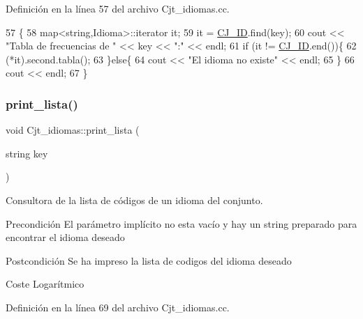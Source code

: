 Definición en la línea 57 del archivo Cjt\+\_\+idiomas.\+cc.


\begin{DoxyCode}
57                                        \{
58   map<string,Idioma>::iterator it;
59   it = \hyperlink{class_cjt__idiomas_aeb67a7100b1345a160fb85466bd4e5f6}{CJ\_ID}.find(key);
60   cout << \textcolor{stringliteral}{"Tabla de frecuencias de "} << key << \textcolor{stringliteral}{":"} << endl;
61   \textcolor{keywordflow}{if} (it != \hyperlink{class_cjt__idiomas_aeb67a7100b1345a160fb85466bd4e5f6}{CJ\_ID}.end())\{
62     (*it).second.tabla();
63   \}\textcolor{keywordflow}{else}\{
64     cout << \textcolor{stringliteral}{"El idioma no existe"} << endl;
65   \}
66   cout << endl;
67 \}
\end{DoxyCode}
\mbox{\label{class_cjt__idiomas_a0ac0bb2a2fe0cf4abd10d9366da9fa10}} 
\subsubsection{\texorpdfstring{print\+\_\+lista()}{print\_lista()}}
{\footnotesize\ttfamily void Cjt\+\_\+idiomas\+::print\+\_\+lista (\begin{DoxyParamCaption}\item[{string}]{key }\end{DoxyParamCaption})}



Consultora de la lista de códigos de un idioma del conjunto. 

\begin{DoxyPrecond}{Precondición}
El parámetro implícito no esta vacío y hay un string preparado para encontrar el idioma deseado 
\end{DoxyPrecond}
\begin{DoxyPostcond}{Postcondición}
Se ha impreso la lista de codigos del idioma deseado 
\end{DoxyPostcond}
\begin{DoxyParagraph}{Coste}
Logarítmico 
\end{DoxyParagraph}


Definición en la línea 69 del archivo Cjt\+\_\+idiomas.\+cc.



